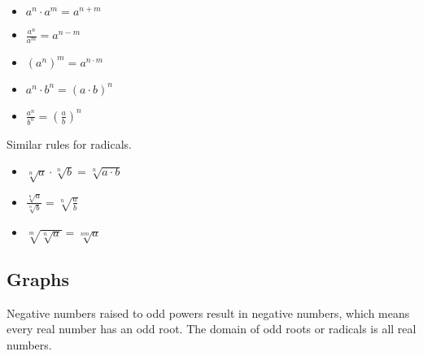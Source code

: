 \documentclass{ximera}
\begin{document}
\begin{itemize}
\item $a^n \cdot a^m = a^{n+m}$

\item $\frac{a^n}{a^m} = a^{n-m}$

\item $(a^n)^m = a^{n \cdot m}$

\item $a^n \cdot b^n = (a \cdot b)^n$

\item $\frac{a^n}{b^n} = \left(\frac{a}{b}\right)^n$


\end{itemize}



Similar rules for radicals.

\begin{itemize}

\item $\sqrt[n]{a} \cdot \sqrt[n]{b} = \sqrt[n]{a \cdot b}$

\item $\frac{\sqrt[n]{a}}{\sqrt[n]{b}} = \sqrt[n]{\frac{a}{b}}$

\item $\sqrt[m]{\sqrt[n]{a}} = \sqrt[nm]{a}$

\end{itemize}






\subsection*{Graphs}



Negative numbers raised to odd powers result in negative numbers, which means every real number has an odd root.  The domain of odd roots or radicals is all real numbers.
\end{document}
